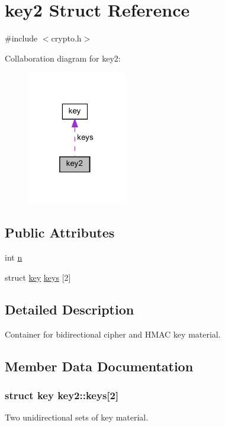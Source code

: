 \hypertarget{structkey2}{}\section{key2 Struct Reference}
\label{structkey2}


{\ttfamily \#include $<$crypto.\+h$>$}



Collaboration diagram for key2\+:
\nopagebreak
\begin{figure}[H]
\begin{center}
\leavevmode
\includegraphics[width=124pt]{structkey2__coll__graph}
\end{center}
\end{figure}
\subsection*{Public Attributes}
\begin{DoxyCompactItemize}
\item 
int \hyperlink{structkey2_a325d016ea0977d9569d3d75fd4e7fe06}{n}
\item 
struct \hyperlink{structkey}{key} \hyperlink{structkey2_a9698a633f0112a2000a0efdb8d960010}{keys} \mbox{[}2\mbox{]}
\end{DoxyCompactItemize}


\subsection{Detailed Description}
Container for bidirectional cipher and H\+M\+A\+C key material. 

\subsection{Member Data Documentation}
\hypertarget{structkey2_a9698a633f0112a2000a0efdb8d960010}{}
\subsubsection[{keys}]{\setlength{\rightskip}{0pt plus 5cm}struct {\bf key} key2\+::keys\mbox{[}2\mbox{]}}\label{structkey2_a9698a633f0112a2000a0efdb8d960010}
Two unidirectional sets of key material. \hypertarget{structkey2_a325d016ea0977d9569d3d75fd4e7fe06}{}
